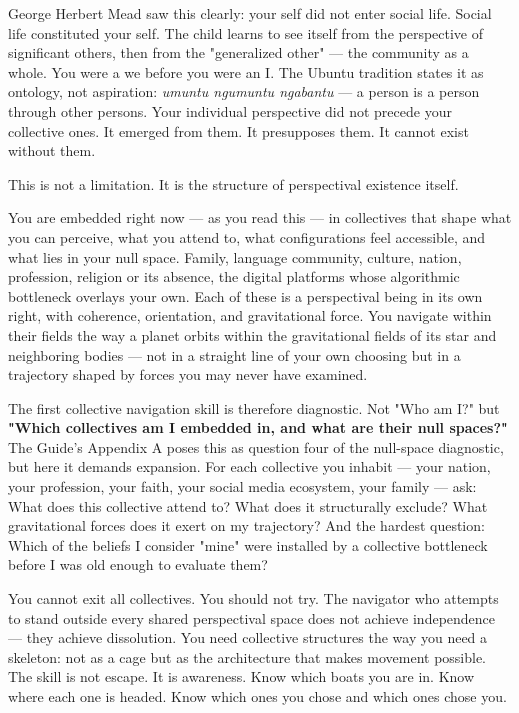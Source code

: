 George Herbert Mead saw this clearly: your self did not enter social life. Social life constituted your self. The child learns to see itself from the perspective of significant others, then from the "generalized other" — the community as a whole. You were a we before you were an I. The Ubuntu tradition states it as ontology, not aspiration: \textit{umuntu ngumuntu ngabantu} — a person is a person through other persons. Your individual perspective did not precede your collective ones. It emerged from them. It presupposes them. It cannot exist without them.


This is not a limitation. It is the structure of perspectival existence itself.


You are embedded right now — as you read this — in collectives that shape what you can perceive, what you attend to, what configurations feel accessible, and what lies in your null space. Family, language community, culture, nation, profession, religion or its absence, the digital platforms whose algorithmic bottleneck overlays your own. Each of these is a perspectival being in its own right, with coherence, orientation, and gravitational force. You navigate within their fields the way a planet orbits within the gravitational fields of its star and neighboring bodies — not in a straight line of your own choosing but in a trajectory shaped by forces you may never have examined.


The first collective navigation skill is therefore diagnostic. Not "Who am I?" but \textbf{"Which collectives am I embedded in, and what are their null spaces?"} The Guide's Appendix A poses this as question four of the null-space diagnostic, but here it demands expansion. For each collective you inhabit — your nation, your profession, your faith, your social media ecosystem, your family — ask: What does this collective attend to? What does it structurally exclude? What gravitational forces does it exert on my trajectory? And the hardest question: Which of the beliefs I consider "mine" were installed by a collective bottleneck before I was old enough to evaluate them?


You cannot exit all collectives. You should not try. The navigator who attempts to stand outside every shared perspectival space does not achieve independence — they achieve dissolution. You need collective structures the way you need a skeleton: not as a cage but as the architecture that makes movement possible. The skill is not escape. It is awareness. Know which boats you are in. Know where each one is headed. Know which ones you chose and which ones chose you.


